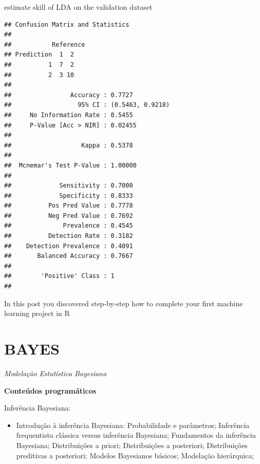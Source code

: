 \documentclass[]{book}
\newenvironment{Shaded}{\begin{snugshade}}{\end{snugshade}}
\newcommand{\KeywordTok}[1]{\textcolor[rgb]{0.13,0.29,0.53}{\textbf{#1}}}
\newcommand{\NormalTok}[1]{#1}
\newcommand{\OperatorTok}[1]{\textcolor[rgb]{0.81,0.36,0.00}{\textbf{#1}}}
\newcommand{\StringTok}[1]{\textcolor[rgb]{0.31,0.60,0.02}{#1}}
\providecommand{\tightlist}{%
  \setlength{\itemsep}{0pt}\setlength{\parskip}{0pt}}
\begin{document}
estimate skill of LDA on the validation dataset

\begin{Shaded}
\end{Shaded}

\begin{verbatim}
## Confusion Matrix and Statistics
## 
##           Reference
## Prediction  1  2
##          1  7  2
##          2  3 10
##                                           
##                Accuracy : 0.7727          
##                  95% CI : (0.5463, 0.9218)
##     No Information Rate : 0.5455          
##     P-Value [Acc > NIR] : 0.02455         
##                                           
##                   Kappa : 0.5378          
##                                           
##  Mcnemar's Test P-Value : 1.00000         
##                                           
##             Sensitivity : 0.7000          
##             Specificity : 0.8333          
##          Pos Pred Value : 0.7778          
##          Neg Pred Value : 0.7692          
##              Prevalence : 0.4545          
##          Detection Rate : 0.3182          
##    Detection Prevalence : 0.4091          
##       Balanced Accuracy : 0.7667          
##                                           
##        'Positive' Class : 1               
## 
\end{verbatim}

In this post you discovered step-by-step how to complete your first machine learning project in R

\hypertarget{bayes}{%
\chapter{BAYES}\label{bayes}}

\emph{Modelação Estatística Bayesiana}

\textbf{Conteúdos programáticos}

Inferência Bayesiana:

\begin{itemize}
\tightlist
\item
  Introdução à inferência Bayesiana: Probabilidade e parâmetros; Inferência frequentista clássica versus inferência Bayesiana; Fundamentos da inferência Bayesiana; Distribuições a priori; Distribuições a posteriori; Distribuições preditivas a posteriori; Modelos Bayesianos básicos; Modelação hierárquica;
\end{itemize}
\end{document}
